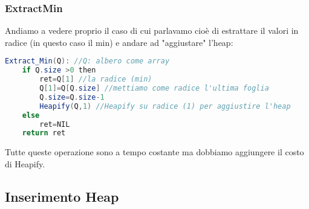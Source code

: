 \subsubsection{ExtractMin}
Andiamo a vedere proprio il caso di cui parlavamo cioè di estrattare il valori in radice (in questo caso il min) e andare ad "aggiustare" l'heap:
\begin{lstlisting}[language=Java]
Extract_Min(Q): //Q: albero come array
    if Q.size >0 then
        ret=Q[1] //la radice (min)
        Q[1]=Q[Q.size] //mettiamo come radice l'ultima foglia
        Q.size=Q.size-1 
        Heapify(Q,1) //Heapify su radice (1) per aggiustire l'heap 
    else 
        ret=NIL 
    return ret
\end{lstlisting}
Tutte queste operazione sono a tempo costante ma dobbiamo aggiungere il costo di Heapify.

\subsection{Inserimento Heap}
